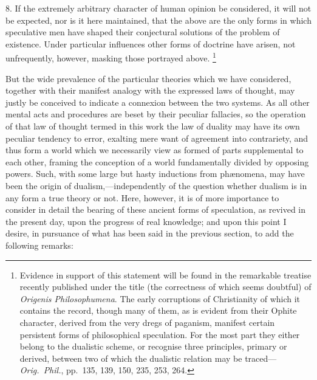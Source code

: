 \documentclass[oneside]{book}
\begin{document}
8. If the extremely arbitrary character of human opinion be
considered, it will not be expected, nor is it here maintained, that
the above are the only forms in which speculative men have
shaped their conjectural solutions of the problem of existence.
Under particular influences other forms of doctrine have arisen,
not unfrequently, however, masking those portrayed above.%
\footnote{Evidence in support of this statement will be found in the remarkable
treatise recently published under the title (the correctness of which seems doubtful)
of \textit{Origenis Philosophumena}. The early corruptions of Christianity of which
it contains the record, though many of them, as is evident from their Ophite
character, derived from the very dregs of paganism, manifest certain persistent
forms of philosophical speculation. For the most part they either belong to the
dualistic scheme, or recognise three principles, primary or derived, between two
of which the dualistic relation may be traced---\textit{Orig.~Phil.}, pp.~135, 139, 150,
235, 253, 264.}%

But the wide prevalence of the particular theories which we have
considered, together with their manifest analogy with the expressed
laws of thought, may justly be conceived to indicate a
connexion between the two systems. As all other mental acts
and procedures are beset by their peculiar fallacies, so the operation
of that law of thought termed in this work the law of duality
may have its own peculiar tendency to error, exalting mere want
of agreement into contrariety, and thus form a world which we
necessarily view as formed of parts supplemental to each other,
framing the conception of a world fundamentally divided by opposing
powers. Such, with some large but hasty inductions from
ph{\ae}nomena, may have been the origin of dualism,---independently
of the question whether dualism is in any form a true
theory or not. Here, however, it is of more importance to consider
in detail the bearing of these ancient forms of speculation,
as revived in the present day, upon the progress of real knowledge;
and upon this point I desire, in pursuance of what has
been said in the previous section, to add the following remarks:
\end{document}
